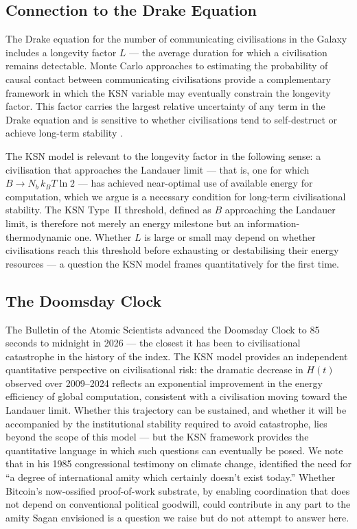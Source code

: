 \subsection{Connection to the Drake Equation}
\label{sec:drake}

The Drake equation for the number of communicating civilisations in the Galaxy includes a
longevity factor $L$ --- the average duration for which a civilisation remains detectable.
Monte Carlo approaches to estimating the probability of causal contact between
communicating civilisations \citep{Lares2020} provide a complementary framework in which
the KSN variable may eventually constrain the longevity factor. This factor carries the
largest relative uncertainty of any term in the Drake equation and is sensitive to whether
civilisations tend to self-destruct or achieve long-term stability \citep{Gray2020}.

The KSN model is relevant to the longevity factor in the following sense: a civilisation
that approaches the Landauer limit --- that is, one for which $B\to N_b\,k_B T\ln 2$ ---
has achieved near-optimal use of available energy for computation, which we argue is a
necessary condition for long-term civilisational stability. The KSN Type~II threshold,
defined as $B$ approaching the Landauer limit, is therefore not merely an energy milestone
but an information-thermodynamic one. Whether $L$ is large or small may depend on whether
civilisations reach this threshold before exhausting or destabilising their energy
resources --- a question the KSN model frames quantitatively for the first time.

\subsection{The Doomsday Clock}
\label{sec:doomsday}

The Bulletin of the Atomic Scientists advanced the Doomsday Clock to 85 seconds to
midnight in 2026 --- the closest it has been to civilisational catastrophe in the history
of the index. The KSN model provides an independent quantitative perspective on
civilisational risk: the dramatic decrease in $H(t)$ observed over 2009--2024 reflects an
exponential improvement in the energy efficiency of global computation, consistent with a
civilisation moving toward the Landauer limit. Whether this trajectory can be sustained,
and whether it will be accompanied by the institutional stability required to avoid
catastrophe, lies beyond the scope of this model --- but the KSN framework provides the
quantitative language in which such questions can eventually be posed. We note that in his
1985 congressional testimony on climate change, \citet{Sagan1985} identified the need for
``a degree of international amity which certainly doesn't exist today.'' Whether Bitcoin's
now-ossified proof-of-work substrate, by enabling coordination that does not depend on
conventional political goodwill, could contribute in any part to the amity Sagan envisioned is a
question we raise but do not attempt to answer here.


